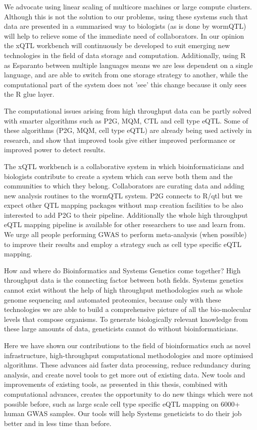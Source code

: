 We advocate using linear scaling of multicore machines or large compute clusters. Although this is not the solution to our problems, using these 
systems such that data are presented in a summarised way to biologists (as is done by wormQTL) will help to relieve some of the immediate need 
of collaborators. In our opinion the xQTL workbench will continuously be developed to suit emerging new technologies in the field of data storage 
and computation. Additionally, using R as Esparanto between multiple languages means we are less dependent on a single language, and are able to 
switch from one storage strategy to another, while the computational part of the system does not 'see' this change because it only sees the R 
glue layer.

The computational issues arising from high throughput data can be partly solved with smarter algorithms such as P2G, MQM, CTL and cell type eQTL. 
Some of these algorithms (P2G, MQM, cell type eQTL) are already being used actively in research, and show that improved tools give either improved 
performance or improved power to detect results. 

The xQTL workbench is a collaborative system in which bioinformaticians and biologists contribute to create a system which can serve both them and 
the communities to which they belong. Collaborators are curating data and adding new analysis routines to the wormQTL system. P2G connects to R/qtl 
but we expect other QTL mapping packages without map creation facilities to be also interested to add P2G to their pipeline. Additionally the 
whole high throughput eQTL mapping pipeline is available for other researchers to use and learn from. We urge all people performing GWAS to perform 
meta-analysis (when possible) to improve their results and employ a strategy such as cell type specific eQTL mapping. 

How and where do Bioinformatics and Systems Genetics come together? High throughput data is the connecting factor between both fields. Systems 
genetics cannot exist without the help of high throughput methodologies such as whole genome sequencing and automated proteomics, because only 
with these technologies we are able to build a comprehensive picture of all the bio-molecular levels that compose organisms. To generate 
biologically relevant knowledge from these large amounts of data, geneticists cannot do without bioinformaticians. 

Here we have shown our contributions to the field of bioinformatics such as novel infrastructure, high-throughput computational methodologies and 
more optimised algorithms. These advances aid faster data processing, reduce redundancy during analysis, and create novel tools to get more out 
of existing data. New tools and improvements of existing tools, as presented in this thesis, combined with computational advances, creates the 
opportunity to do new things which were not possible before, such as large scale cell type specific eQTL mapping on 6000+ human GWAS samples. Our 
tools will help Systems geneticists to do their job better and in less time than before.  


